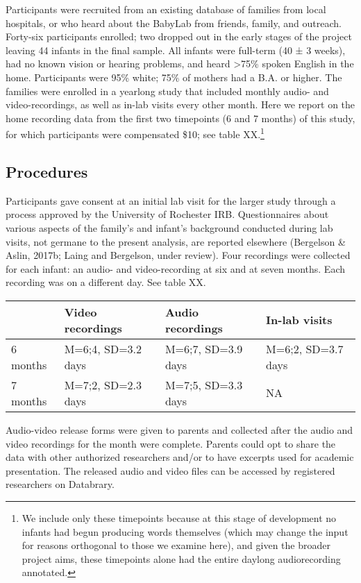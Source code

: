 \documentclass[floatsintext,man]{apa6}
\theoremstyle{definition}
\theoremstyle{definition}
\theoremstyle{definition}
\theoremstyle{remark}
\begin{document}
Participants were recruited from an existing database of families from
local hospitals, or who heard about the BabyLab from friends, family,
and outreach. Forty-six participants enrolled; two dropped out in the
early stages of the project leaving 44 infants in the final sample. All
infants were full-term (40 ± 3 weeks), had no known vision or hearing
problems, and heard \textgreater{}75\% spoken English in the home.
Participants were 95\% white; 75\% of mothers had a B.A. or higher. The
families were enrolled in a yearlong study that included monthly audio-
and video-recordings, as well as in-lab visits every other month. Here
we report on the home recording data from the first two timepoints (6
and 7 months) of this study, for which participants were compensated
\$10; see table
XX.\footnote{We include only these timepoints because at this stage of development no infants had begun producing words themselves (which may change the input for reasons orthogonal to those we examine here), and given the broader project aims, these timepoints alone had the entire daylong audiorecording annotated.}

\subsection{Procedures}\label{procedures}

Participants gave consent at an initial lab visit for the larger study
through a process approved by the University of Rochester IRB.
Questionnaires about various aspects of the family's and infant's
background conducted during lab visits, not germane to the present
analysis, are reported elsewhere (Bergelson \& Aslin, 2017b; Laing and
Bergelson, under review). Four recordings were collected for each
infant: an audio- and video-recording at six and at seven months. Each
recording was on a different day. See table XX.

\begin{longtable}[]{@{}llll@{}}
\toprule
& Video recordings & Audio recordings & In-lab visits\tabularnewline
\midrule
\endhead
6 months & M=6;4, SD=3.2 days & M=6;7, SD=3.9 days & M=6;2, SD=3.7
days\tabularnewline
7 months & M=7;2, SD=2.3 days & M=7;5, SD=3.3 days & NA\tabularnewline
\bottomrule
\end{longtable}

Audio-video release forms were given to parents and collected after the
audio and video recordings for the month were complete. Parents could
opt to share the data with other authorized researchers and/or to have
excerpts used for academic presentation. The released audio and video
files can be accessed by registered researchers on Databrary.
\end{document}

